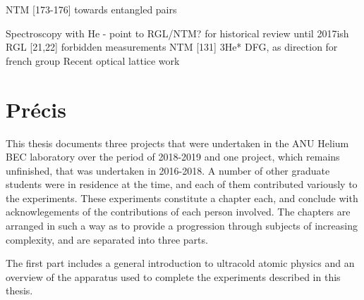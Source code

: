 		NTM [173-176] towards entangled pairs 
			
		Spectroscopy with He - point to RGL/NTM? for historical review until 2017ish
			RGL [21,22] forbidden measurements  
		NTM [131] 3He* DFG, as direction for french group 
		Recent optical lattice work


\section*{Pr\'{e}cis}\label{sec:abstract}



	This thesis documents three projects that were undertaken in the ANU
	Helium BEC laboratory over the period of 2018-2019 and one project,
	which remains unfinished, that was undertaken in 2016-2018.
		A number of
	other graduate students were in residence at the time, and each of them
	contributed variously to the experiments.
		These experiments constitute a
	chapter each, and conclude with acknowlegements of the contributions of
	each person involved.
		The chapters are arranged in such a way as to
	provide a progression through subjects of increasing complexity, and are
	separated into three parts.

	The first part includes a general introduction to ultracold atomic
	physics and an overview of the apparatus used to complete the
	experiments described in this thesis.

